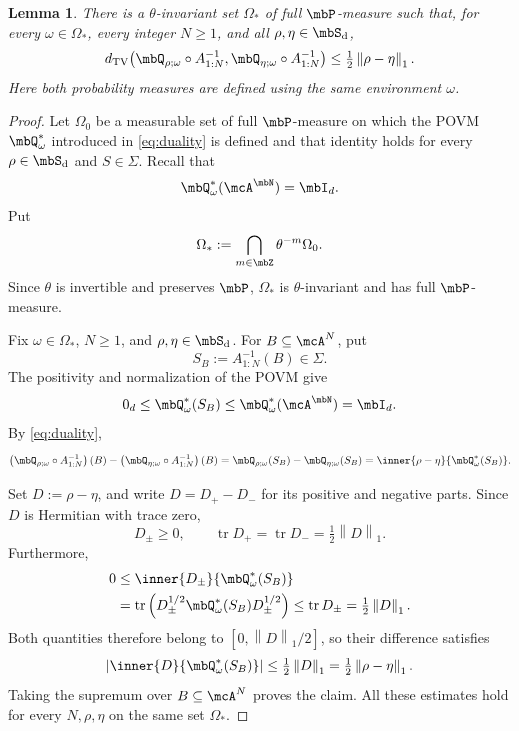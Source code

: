 \documentclass[a4paper]{article}
\numberwithin{equation}{section}   %
\theoremstyle{plain}   %
\theoremstyle{plain}   %
\newtheorem{lemma}{Lemma}[section]   %
\theoremstyle{examplestyle}
\DeclareMathOperator{\states}{\mbS_d}   %
\DeclareMathOperator{\pr}{\mbP}           %
\DeclareMathOperator{\str}{tr} %
\newcommand{\unorm}[1]{\left\lVert#1\right\rVert}
\begin{document}
\begin{lemma}
\label{univ:lem:povm}
    There is a $\theta$-invariant set $\Omega_*$ of full $\pr$-measure such that, for every $\omega\in\Omega_*$,  every integer $N\ge1$, and all $\rho,\eta\in\states$,
    \[
        d_{\mathrm{TV}}\!\left(
            \mbQ_{\rho;\omega}\circ A_{1:N}^{-1},
            \mbQ_{\eta;\omega}\circ A_{1:N}^{-1}
        \right)
        \le \tfrac12\unorm{\rho-\eta}_1.
    \]
    Here both probability measures are defined using the same environment $\omega$.
\end{lemma}
%
\begin{proof}
    Let $\Omega_0$ be a measurable set of full $\pr$-measure on which the POVM $\mbQ^*_\omega$ introduced in \eqref{eq:duality} is defined and that identity holds for every $\rho\in\states$ and $S\in\Sigma$.
    Recall that
    \[
        \mbQ^*_\omega(\mcA^\mbN)=\mbI_d.
    \]
    Put
    \[
        \Omega_*:=\bigcap_{m\in\mbZ}\theta^{-m}\Omega_0.
    \]
    Since $\theta$ is invertible and preserves $\pr$, $\Omega_*$ is $\theta$-invariant and has full $\pr$-measure.

    Fix $\omega\in\Omega_*$, $N\ge1$, and $\rho,\eta\in\states$.
    For $B\subseteq\mcA^N$, put
    \[
        S_B:=A_{1:N}^{-1}(B)\in\Sigma.
    \]
    The positivity and normalization of the POVM give
    \[
        0_d\le\mbQ^*_\omega(S_B)
        \le\mbQ^*_\omega(\mcA^\mbN)=\mbI_d.
    \]
    By \eqref{eq:duality},
    \[
        \begin{aligned}
            \left(\mbQ_{\rho;\omega}\circ A_{1:N}^{-1}\right)(B)
            -
            \left(\mbQ_{\eta;\omega}\circ A_{1:N}^{-1}\right)(B)
            =\mbQ_{\rho;\omega}(S_B)-\mbQ_{\eta;\omega}(S_B)
            =\inner{\rho-\eta}{\mbQ^*_\omega(S_B)}.
        \end{aligned}
    \]

    Set $D:=\rho-\eta$, and write $D=D_+-D_-$ for its positive and negative parts. 
    Since $D$ is Hermitian with trace zero,
    \[
        D_\pm\ge0,
        \qquad
        \str D_+=\str D_-=\tfrac12\unorm{D}_1.
    \]
    Furthermore,
    \[
        \begin{aligned}
            0
            &\le\inner{D_\pm}{\mbQ^*_\omega(S_B)}\\
            &=\str\left(
                D_\pm^{1/2}\mbQ^*_\omega(S_B)D_\pm^{1/2}
              \right)
            \le\str D_\pm
            =\tfrac12\unorm{D}_1.
        \end{aligned}
    \]
    Both quantities therefore belong to $[0,\unorm{D}_1/2]$, so their difference satisfies
    \[
        \left|\inner{D}{\mbQ^*_\omega(S_B)}\right|
        \le\tfrac12\unorm{D}_1
        =\tfrac12\unorm{\rho-\eta}_1.
    \]
    Taking the supremum over $B\subseteq\mcA^N$ proves the claim.
    All these estimates hold for every $N,\rho,\eta$ on the same set $\Omega_*$.
\end{proof}
\end{document}
